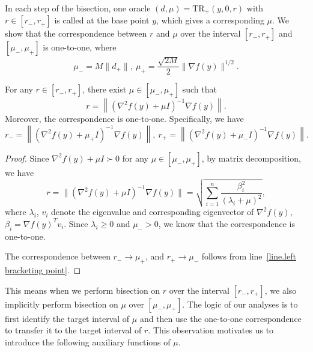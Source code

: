 \documentclass{mcom-l}
\newcommand{\trp}{\textrm{TR}_+}
\numberwithin{equation}{section}
\begin{document}
In each step of the bisection, one oracle $(d,\mu)=\trp(y,0,r)$ with $r\in[r_-,r_+]$ is called at the base point $y$, which gives a corresponding $\mu$. We show that the correspondence between $r$ and $\mu$ over the interval $[r_-,r_+]$ and $[\mu_-,\mu_+]$ is one-to-one, where
\begin{equation*}
    \mu_- = M\|d_+\|, \ \mu_+=\frac{\sqrt{2M}}{2}\|\nabla f(y)\|^{1/2}.
\end{equation*}
\begin{lemma}
    \label{lem.one-to-one correspondence}
    For any $r\in [r_-,r_+]$, there exist $\mu\in [\mu_-,\mu_+]$ such that
    \begin{equation*}
        r= \left\| \left(\nabla^2 f(y)+ \mu I\right)^{-1}\nabla f(y)\right\|.
    \end{equation*}
    Moreover, the correspondence is one-to-one. Specifically, we have
    \begin{equation*}
        r_- = \left \|\left(\nabla^2f(y)+\mu_+ I\right)^{-1}\nabla f(y)\right\|, \ r_+ = \left \|\left(\nabla^2f(y)+\mu_- I\right)^{-1}\nabla f(y)\right\|.
    \end{equation*}
\end{lemma}
\begin{proof}
    Since $\nabla^2 f(y)+\mu I \succ 0$ for any $\mu\in[\mu_-,\mu_+]$, by matrix decomposition, we have
    \begin{equation*}
        r=\|\left (\nabla ^2 f(y)+\mu I \right)^{-1}\nabla f(y)\|=\sqrt{\sum_{i=1}^n \frac{\beta_i^2}{\left (\lambda_i+\mu\right )^2}},
    \end{equation*}
    where $\lambda_i$, $v_i$ denote the eigenvalue and corresponding eigenvector of $\nabla^2 f(y)$, $\beta_i = \nabla f(y)^T v_i$. Since $\lambda_i \geq0$ and $\mu_->0$, we know that the correspondence is one-to-one.

    The correspondence between $r_-\to\mu_+$, and $r_+\to\mu_-$ follows from line~\ref{line.left bracketing point}.
\end{proof}
This means when we perform bisection on $r$ over the interval $[r_-,r_+]$, we also implicitly perform bisection on $\mu$ over $[\mu_-,\mu_+]$. The logic of our analyses is to first identify the target interval of $\mu$ and then use the one-to-one correspondence to transfer it to the target interval of $r$. This observation motivates us to introduce the following auxiliary functions of $\mu$.
\end{document}
